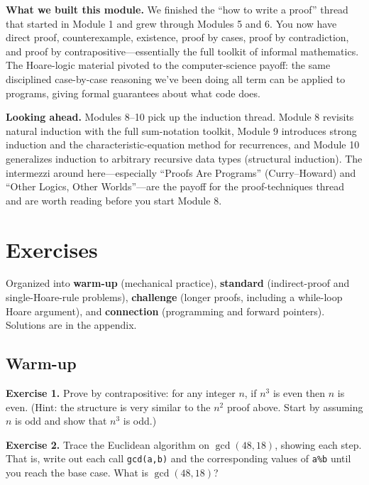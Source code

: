 \documentclass[11pt]{article}
\begin{document}
\begin{summarybox}
\textbf{What we built this module.} We finished the ``how to write a proof'' thread that started in Module 1 and grew through Modules 5 and 6. You now have direct proof, counterexample, existence, proof by cases, proof by contradiction, and proof by contrapositive---essentially the full toolkit of informal mathematics. The Hoare-logic material pivoted to the computer-science payoff: the same disciplined case-by-case reasoning we've been doing all term can be applied to programs, giving formal guarantees about what code does.

\medskip
\textbf{Looking ahead.} Modules 8--10 pick up the induction thread. Module 8 revisits natural induction with the full sum-notation toolkit, Module 9 introduces strong induction and the characteristic-equation method for recurrences, and Module 10 generalizes induction to arbitrary recursive data types (structural induction). The intermezzi around here---especially ``Proofs Are Programs'' (Curry--Howard) and ``Other Logics, Other Worlds''---are the payoff for the proof-techniques thread and are worth reading before you start Module 8.
\end{summarybox}

\section{Exercises}

Organized into \textbf{warm-up} (mechanical practice), \textbf{standard} (indirect-proof and single-Hoare-rule problems), \textbf{challenge} (longer proofs, including a while-loop Hoare argument), and \textbf{connection} (programming and forward pointers). Solutions are in the appendix.

\subsection*{Warm-up}

\textbf{Exercise 1.}\label{ex:m7:1} Prove by contrapositive: for any integer $n$, if $n^3$ is even then $n$ is even. (Hint: the structure is very similar to the $n^2$ proof above. Start by assuming $n$ is odd and show that $n^3$ is odd.)

\bigskip
\textbf{Exercise 2.}\label{ex:m7:2} Trace the Euclidean algorithm on $\gcd(48, 18)$, showing each step. That is, write out each call \texttt{gcd(a,b)} and the corresponding values of \texttt{a\%b} until you reach the base case. What is $\gcd(48,18)$?
\end{document}
